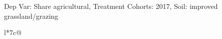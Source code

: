 \begin{table}[H]
\captionlistentry[table]{}
\label{table:beaver_land_class_DVis_land_class_1_SCg2_SSIGRG}
\scriptsize %
Dep Var: Share agricultural, Treatment Cohorts: 2017, Soil: improved grassland/grazing \\
\begin{threeparttable}
\begin{tabulary}{\textwidth}{l*{7}{c}@{}}
\toprule \toprule
\noalign{\smallskip}
\noalign{\smallskip}
\midrule \bottomrule
\end{tabulary}
\medskip
\end{threeparttable}
\end{table}
